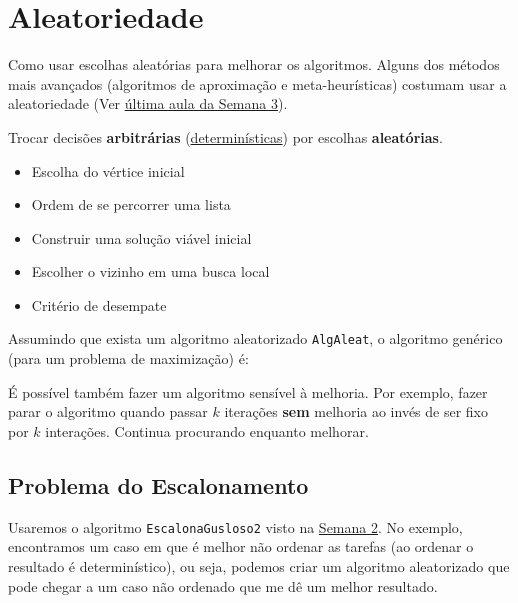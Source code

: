 \chapter{Aleatoriedade}

Como usar escolhas aleatórias para melhorar os algoritmos. Alguns dos métodos mais avançados (algoritmos de aproximação e meta-heurísticas) costumam usar a aleatoriedade (Ver \hyperref[sec:metaheuristicas]{última aula da Semana 3}).

Trocar decisões \textbf{arbitrárias} (\underline{determinísticas}) por escolhas \textbf{aleatórias}.

\begin{itemize}
	\item Escolha do vértice inicial
	\item Ordem de se percorrer uma lista
	\item Construir uma solução viável inicial
	\item Escolher o vizinho em uma busca local
	\item Critério de desempate
\end{itemize}

Assumindo que exista um algoritmo aleatorizado \lstinline{AlgAleat}, o algoritmo genérico (para um problema de maximização) é:

\begin{algorithm}
	\SetAlgoLined
\end{algorithm}

É possível também fazer um algoritmo sensível à melhoria. Por exemplo, fazer parar o algoritmo quando passar $k$ iterações \textbf{sem} melhoria ao invés de ser fixo por $k$ interações. Continua procurando enquanto melhorar.

\section{Problema do Escalonamento}

Usaremos o algoritmo \lstinline{EscalonaGusloso2} visto na \hyperref[chp:semana2]{Semana 2}. No exemplo, encontramos um caso em que é melhor não ordenar as tarefas (ao ordenar o resultado é determinístico), ou seja, podemos criar um algoritmo aleatorizado que pode chegar a um caso não ordenado que me dê um melhor resultado.

